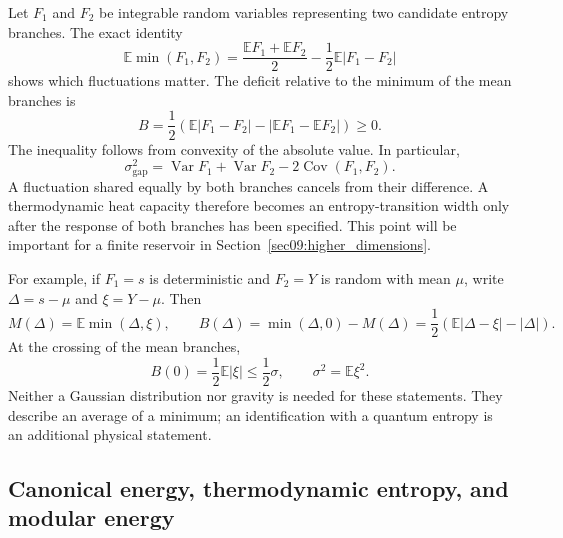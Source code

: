 \documentclass[11pt,letterpaper]{article}
\theoremstyle{plain}
\theoremstyle{definition}
\theoremstyle{remark}
\begin{document}
Let $F_1$ and $F_2$ be integrable random variables representing two candidate
entropy branches. The exact identity
\begin{equation}
 \mathbb E\min(F_1,F_2)
 =\frac{\mathbb EF_1+\mathbb EF_2}{2}
  -\frac12\mathbb E|F_1-F_2|
 \label{eq08:branch_identity}
\end{equation}
shows which fluctuations matter. The deficit relative to the minimum of the
mean branches is
\begin{equation}
 B=\frac12\left(\mathbb E|F_1-F_2|
             -|\mathbb EF_1-\mathbb EF_2|\right)\geq0.
 \label{eq08:branch_deficit}
\end{equation}
The inequality follows from convexity of the absolute value. In particular,
\begin{equation}
 \sigma_{\mathrm{gap}}^2
 =\operatorname{Var}F_1+\operatorname{Var}F_2
  -2\operatorname{Cov}(F_1,F_2).
 \label{eq08:gap_variance}
\end{equation}
A fluctuation shared equally by both branches cancels from their difference.
A thermodynamic heat capacity therefore becomes an entropy-transition width
only after the response of both branches has been specified. This point will
be important for a finite reservoir in Section~\ref{sec09:higher_dimensions}.

For example, if $F_1=s$ is deterministic and $F_2=Y$ is random with mean $\mu$,
write $\Delta=s-\mu$ and $\xi=Y-\mu$. Then
\begin{equation}
 M(\Delta)=\mathbb E\min(\Delta,\xi),\qquad
 B(\Delta)=\min(\Delta,0)-M(\Delta)
 =\frac12\left(\mathbb E|\Delta-\xi|-|\Delta|\right).
 \label{eq08:general_minimum}
\end{equation}
At the crossing of the mean branches,
\begin{equation}
 B(0)=\frac12\mathbb E|\xi|\leq\frac12\sigma,
 \qquad \sigma^2=\mathbb E\xi^2.
 \label{eq08:general_midpoint}
\end{equation}
Neither a Gaussian distribution nor gravity is needed for these statements.
They describe an average of a minimum; an identification with a quantum
entropy is an additional physical statement.

\subsection{Canonical energy, thermodynamic entropy, and modular energy}
\end{document}
